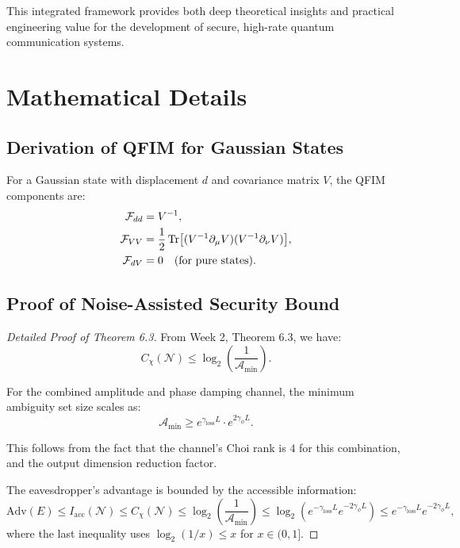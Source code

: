 \documentclass[12pt]{article}
\begin{document}
This integrated framework provides both deep theoretical insights and practical engineering value for the development of secure, high-rate quantum communication systems.

\appendix

\section{Mathematical Details}

\subsection{Derivation of QFIM for Gaussian States}

For a Gaussian state with displacement \(d\) and covariance matrix \(V\), the QFIM components are:
\begin{align}
    \mathcal{F}_{dd} &= V^{-1}, \\
    \mathcal{F}_{VV} &= \frac{1}{2}\Tr[(V^{-1}\partial_\mu V)(V^{-1}\partial_\nu V)], \\
    \mathcal{F}_{dV} &= 0 \quad \text{(for pure states)}.
\end{align}

\subsection{Proof of Noise-Assisted Security Bound}

\begin{proof}[Detailed Proof of Theorem 6.3]
From Week 2, Theorem 6.3, we have:
\begin{equation}
    C_\chi(\mathcal{N}) \leq \log_2\left(\frac{1}{\mathcal{A}_{\min}}\right).
\end{equation}

For the combined amplitude and phase damping channel, the minimum ambiguity set size scales as:
\begin{equation}
    \mathcal{A}_{\min} \geq e^{\gamma_{\text{loss}}L} \cdot e^{2\gamma_\phi L}.
\end{equation}

This follows from the fact that the channel's Choi rank is \(4\) for this combination, and the output dimension reduction factor.

The eavesdropper's advantage is bounded by the accessible information:
\begin{equation}
    \text{Adv}(E) \leq I_{\text{acc}}(\mathcal{N}) \leq C_\chi(\mathcal{N}) \leq \log_2\left(\frac{1}{\mathcal{A}_{\min}}\right) \leq \log_2\left(e^{-\gamma_{\text{loss}}L} e^{-2\gamma_\phi L}\right) \leq e^{-\gamma_{\text{loss}}L} e^{-2\gamma_\phi L},
\end{equation}
where the last inequality uses \(\log_2(1/x) \leq x\) for \(x \in (0,1]\).
\end{proof}
\end{document}
